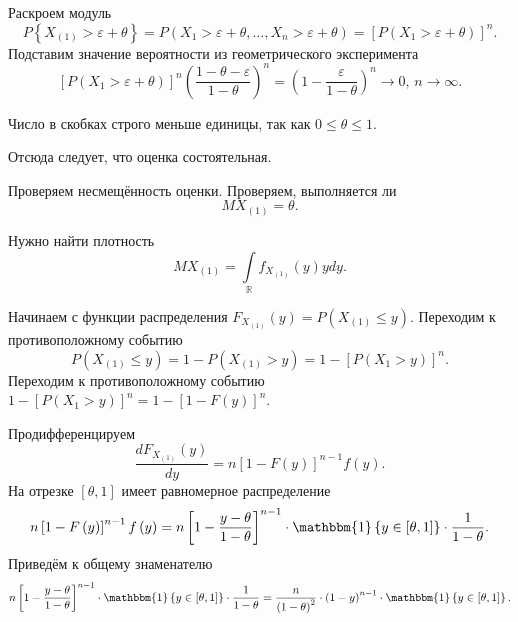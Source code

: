 Раскроем модуль
$$P \left\{ X_{ \left( 1 \right) } > \varepsilon + \theta \right\} =
  P \left( X_1 > \varepsilon + \theta, \dotsc, X_n > \varepsilon + \theta \right) =
  \left[ P \left( X_1 > \varepsilon + \theta \right) \right]^n.$$
Подставим значение вероятности из геометрического эксперимента
$$ \left[ P \left( X_1 > \varepsilon + \theta \right) \right]^n
  \left( \frac{1 - \theta - \varepsilon }{1 - \theta } \right)^n =
  \left( 1 - \frac{ \varepsilon }{1 - \theta } \right)^n \to
  0, \,
  n \to \infty.$$

Число в скобках строго меньше единицы, так как $0 \leq \theta \leq 1$.

Отсюда следует, что оценка состоятельная.

Проверяем несмещённость оценки.
Проверяем, выполняется ли
$$MX_{ \left( 1 \right) } =
  \theta.$$

Нужно найти плотность
$$MX_{ \left( 1 \right) } =
  \int \limits_{ \mathbb{R}} f_{X_{ \left( 1 \right) }} \left( y \right) ydy.$$

Начинаем с функции распределения
$F_{X_{ \left( 1 \right) }} \left( y \right) =
  P \left( X_{ \left( 1 \right) } \leq y \right) $.
Переходим к противоположному событию
$$P \left( X_{ \left( 1 \right) } \leq y \right) =
  1 - P \left( X_{ \left( 1 \right) } > y \right) =
  1 - \left[ P \left( X_1 > y \right) \right]^n.$$
Переходим к противоположному событию
$1 - \left[ P \left( X_1 > y \right) \right]^n =
  1 - \left[ 1 - F \left( y \right) \right]^n$.

Продифференцируем
$$ \frac{dF_{X_{ \left( 1 \right) }} \left( y \right) }{dy} =
  n \left[ 1 - F \left( y \right) \right]^{n - 1} f \left( y \right).$$
На отрезке $ \left[ \theta, 1 \right] $ имеет равномерное распределение
$$n \left[ 1 - F \left( y \right) \right]^{n - 1} f \left( y \right) =
  n \left[ 1 - \frac{y - \theta }{1 - \theta } \right]^{n - 1} \cdot
  \mathbbm{1} \left\{ y \in \left[ \theta, 1 \right] \right\} \cdot \frac{1}{1 - \theta }.$$
Приведём к общему знаменателю
$$n \left[ 1 - \frac{y - \theta }{1 - \theta } \right]^{n - 1} \cdot
  \mathbbm{1} \left\{ y \in \left[ \theta, 1 \right] \right\} \cdot \frac{1}{1 - \theta } =
  \frac{n}{ \left( 1 - \theta \right)^2} \cdot \left( 1 - y \right)^{n - 1} \cdot
  \mathbbm{1} \left\{ y \in \left[ \theta, 1 \right] \right\}.$$

